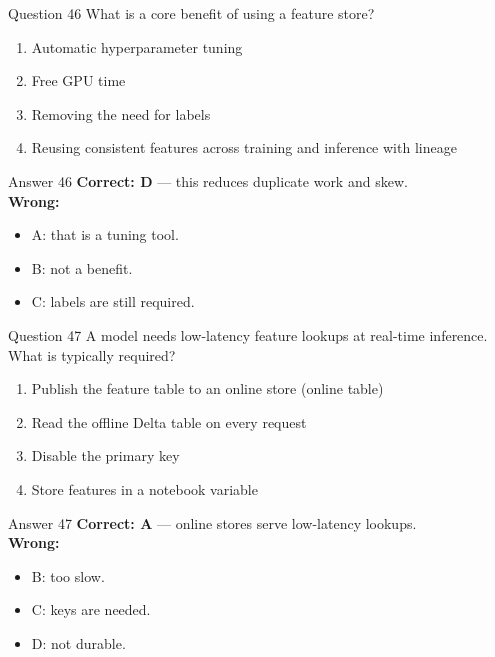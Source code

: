 \documentclass[aspectratio=169,11pt]{beamer}
\begin{document}
	\begin{frame}{Question 46}
		What is a core benefit of using a feature store?
		\begin{enumerate}[label=\Alph*.]
			\item Automatic hyperparameter tuning
			\item Free GPU time
			\item Removing the need for labels
			\item Reusing consistent features across training and inference with lineage
		\end{enumerate}
	\end{frame}
	\begin{frame}{Answer 46}
		\textbf{Correct: D} --- this reduces duplicate work and skew.\\
		\vspace{0.5em}
		\textbf{Wrong:}
		\begin{itemize}
			\item A: that is a tuning tool.
			\item B: not a benefit.
			\item C: labels are still required.
		\end{itemize}
	\end{frame}
	
	\begin{frame}{Question 47}
		A model needs low-latency feature lookups at real-time inference. What is typically required?
		\begin{enumerate}[label=\Alph*.]
			\item Publish the feature table to an online store (online table)
			\item Read the offline Delta table on every request
			\item Disable the primary key
			\item Store features in a notebook variable
		\end{enumerate}
	\end{frame}
	\begin{frame}{Answer 47}
		\textbf{Correct: A} --- online stores serve low-latency lookups.\\
		\vspace{0.5em}
		\textbf{Wrong:}
		\begin{itemize}
			\item B: too slow.
			\item C: keys are needed.
			\item D: not durable.
		\end{itemize}
	\end{frame}
	
\end{document}
